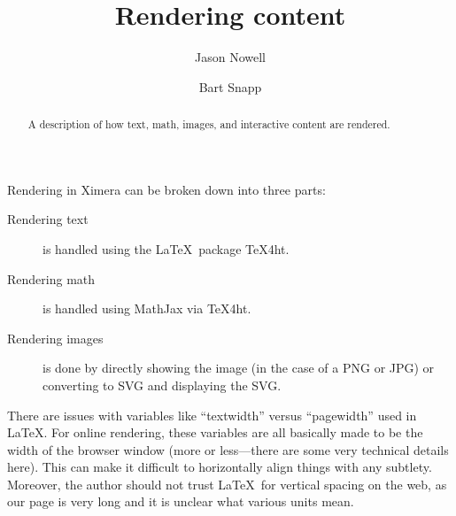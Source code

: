 \documentclass{ximera}
\title{Rendering content}
\author{Jason Nowell \and Bart Snapp}
\begin{document}
\begin{abstract}
    A description of how text, math, images, and interactive content are
    rendered.
\end{abstract}
\maketitle

Rendering in Ximera can be broken down into three parts:
\begin{description}
    \item[Rendering text] is handled using the \LaTeX\ package TeX4ht.
    \item[Rendering math] is handled using MathJax via TeX4ht.
    \item[Rendering images] is done by directly showing the image (in the case
        of a PNG or JPG) or converting to SVG and displaying the SVG.
\end{description}


There are issues with variables like ``textwidth'' versus
``pagewidth'' used in \LaTeX. For online rendering, these variables are all
basically made to be the width of the browser window (more or less---there are
some very technical details here). This can make it difficult to horizontally
align things with any subtlety. Moreover, the author should not trust \LaTeX\ for vertical spacing on the web, as our page is very long and it is unclear what various units mean.
\end{document}
